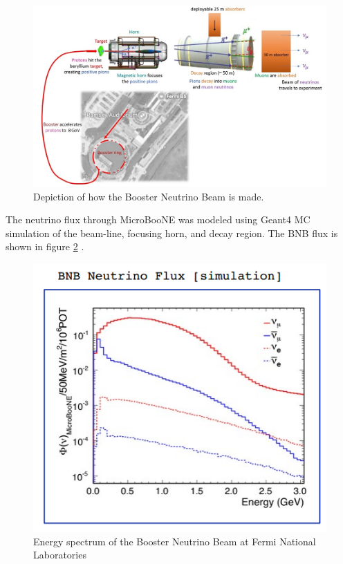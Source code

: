 \begin{figure}[htp!]
\centering
\includegraphics[width=.9\textwidth]{figs/BNB_layout.jpg}
\caption{Depiction of how the Booster Neutrino Beam is made.}
\label{fig:bnb}
\end{figure}

The neutrino flux through MicroBooNE was modeled using Geant4 MC simulation of the beam-line, focusing horn, and decay region. The BNB flux is shown in figure \ref{fig:bnbflux} \cite{neutrinoflux}. 

\begin{figure}[htp!]
\centering
\includegraphics[width=.6\textwidth]{figs/bnbflux.png}
\caption{Energy spectrum of the Booster Neutrino Beam at Fermi National Laboratories \cite{neutrinoflux}}
\label{fig:bnbflux}
\end{figure}


